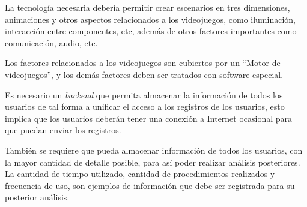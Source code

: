 La tecnología necesaria debería permitir crear escenarios en tres dimensiones,
animaciones y otros aspectos relacionados a los videojuegos, como iluminación,
interacción entre componentes, etc, además de otros factores importantes como
comunicación, audio, etc.

Los factores relacionados a los videojuegos son cubiertos por un \enquote{Motor
de videojuegos}, y los demás factores deben ser tratados con software especial.

Es necesario un \textit{backend} que permita almacenar la información de todos
los usuarios de tal forma a unificar el acceso a los registros de los usuarios,
esto implica que los usuarios deberán tener una conexión a Internet ocasional
para que puedan enviar los registros.

También se requiere que pueda almacenar información de todos los usuarios, con la mayor
cantidad de detalle posible, para así poder realizar análisis posteriores.
La cantidad de tiempo utilizado, cantidad de procedimientos realizados y
frecuencia de uso, son ejemplos de información que debe ser registrada para su
posterior análisis.






